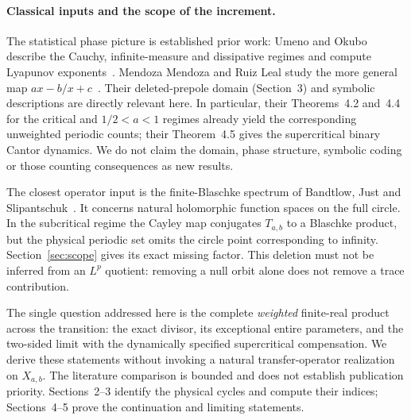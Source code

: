 \paragraph{Classical inputs and the scope of the increment.}
The statistical phase picture is established prior work: Umeno and Okubo
describe the Cauchy, infinite-measure and dissipative regimes and compute
Lyapunov exponents~\citep{umeno2016boole}. Mendoza Mendoza and Ruiz Leal study
the more general map $ax-b/x+c$~\citep{mendoza2022boole}. Their deleted-prepole
domain (Section~3) and symbolic descriptions are directly relevant here. In
particular, their Theorems~4.2 and~4.4 for the critical and $1/2<a<1$ regimes
already yield the corresponding unweighted periodic counts; their Theorem~4.5
gives the supercritical binary Cantor dynamics. We do not claim the domain, phase structure,
symbolic coding or those counting consequences as new results.

The closest operator input is the finite-Blaschke spectrum of Bandtlow, Just
and Slipantschuk~\citep{bandtlow2017spectral}. It concerns natural holomorphic
function spaces on the full circle. In the subcritical regime the Cayley map
conjugates $T_{a,b}$ to a Blaschke product, but the physical periodic set omits
the circle point corresponding to infinity. Section~\ref{sec:scope} gives its
exact missing factor. This deletion must not be inferred from an $L^p$ quotient:
removing a null orbit alone does not remove a trace contribution.

The single question addressed here is the complete \emph{weighted} finite-real
product across the transition: the exact divisor, its exceptional entire
parameters, and the two-sided limit with the dynamically specified
supercritical compensation. We derive these statements without invoking a
natural transfer-operator realization on $X_{a,b}$. The literature comparison
is bounded and does not establish publication priority. Sections~2--3 identify
the physical cycles and compute their indices; Sections~4--5 prove the
continuation and limiting statements.
